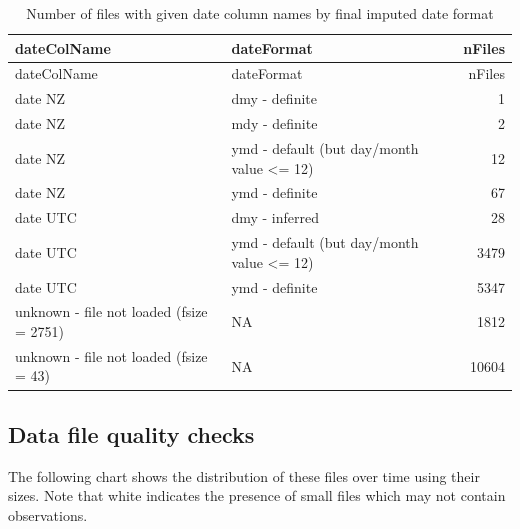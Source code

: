 \documentclass[]{article}
\begin{document}
\begin{longtable}[]{@{}llr@{}}
\caption{Number of files with given date column names by final imputed
date format}\tabularnewline
\toprule
dateColName & dateFormat & nFiles\tabularnewline
\midrule
\endfirsthead
\toprule
dateColName & dateFormat & nFiles\tabularnewline
\midrule
\endhead
date NZ & dmy - definite & 1\tabularnewline
date NZ & mdy - definite & 2\tabularnewline
date NZ & ymd - default (but day/month value \textless{}= 12) &
12\tabularnewline
date NZ & ymd - definite & 67\tabularnewline
date UTC & dmy - inferred & 28\tabularnewline
date UTC & ymd - default (but day/month value \textless{}= 12) &
3479\tabularnewline
date UTC & ymd - definite & 5347\tabularnewline
unknown - file not loaded (fsize = 2751) & NA & 1812\tabularnewline
unknown - file not loaded (fsize = 43) & NA & 10604\tabularnewline
\bottomrule
\end{longtable}

\subsection{Data file quality checks}\label{data-file-quality-checks}

The following chart shows the distribution of these files over time
using their sizes. Note that white indicates the presence of small files
which may not contain observations.
\end{document}
